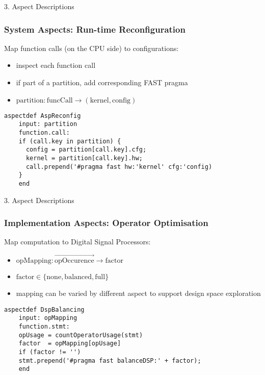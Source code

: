 \begin{frame}[fragile]{3. Aspect Descriptions}
  \frametitle{ System Aspects: Run-time Reconfiguration}
  Map function calls (on the CPU side) to configurations:
  \begin{itemize}
  \item inspect each function call
  \item if part of a partition, add corresponding FAST pragma
  \item $ \text{partition} : \text{funcCall} \rightarrow (\text{kernel}, \text{config}) $
  \end{itemize}

  \begin{lstlisting}[style=lara]
    aspectdef AspReconfig
    input: partition
    function.call:
    if (call.key in partition) {
      config = partition[call.key].cfg;
      kernel = partition[call.key].hw;
      call.prepend('#pragma fast hw:'kernel' cfg:'config)
    }
    end
  \end{lstlisting}
\end{frame}

\begin{frame}[fragile]{3. Aspect Descriptions}
  \frametitle{Implementation Aspects: Operator Optimisation}
  Map computation to Digital Signal Processors:
  \begin{itemize}
  \item $ \text{opMapping} : \overrightarrow{\text{opOccurence}} \rightarrow \text{factor}$
  \item $\text{factor} \in \{\text{none}, \text{balanced}, \text{full}\} $
  \item mapping can be varied by different aspect to support design
    space exploration
  \end{itemize}
  \begin{lstlisting}[label=lst:label, style=lara]
    aspectdef DspBalancing
    input: opMapping
    function.stmt:
    opUsage = countOperatorUsage(stmt)
    factor  = opMapping[opUsage]
    if (factor != '')
    stmt.prepend('#pragma fast balanceDSP:' + factor);
    end
  \end{lstlisting}
\end{frame}

